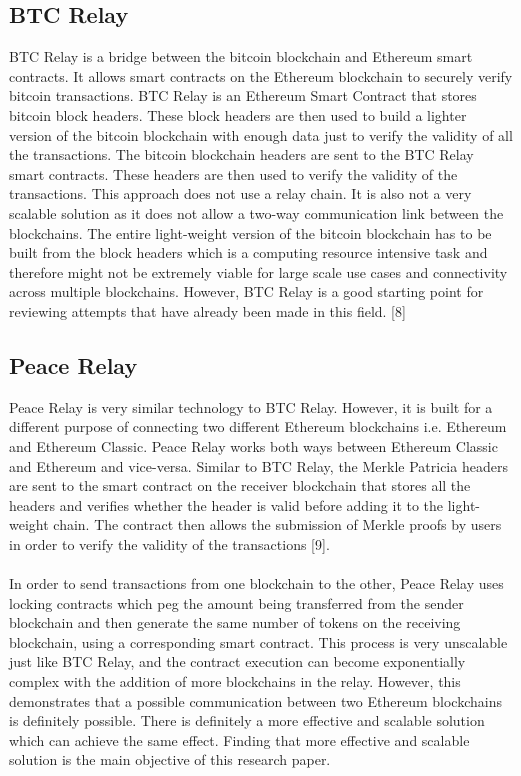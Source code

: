 \documentclass[a4paper,twoside,phd]{BYUPhys}
\begin{document}
\subsection{BTC Relay}
BTC Relay is a bridge between the bitcoin blockchain and Ethereum smart contracts. It allows smart contracts on the Ethereum blockchain to securely verify bitcoin transactions. BTC Relay is an Ethereum Smart Contract that stores bitcoin block headers. These block headers are then used to build a lighter version of the bitcoin blockchain with enough data just to verify the validity of all the transactions. The bitcoin blockchain headers are sent to the BTC Relay smart contracts. These headers are then used to verify the validity of the transactions. This approach does not use a relay chain. It is also not a very scalable solution as it does not allow a two-way communication link between the blockchains. The entire light-weight version of the bitcoin blockchain has to be built from the block headers which is a computing resource intensive task and therefore might not be extremely viable for large scale use cases and connectivity across multiple blockchains. However, BTC Relay is a good starting point for reviewing attempts that have already been made in this field. [8]
\subsection{Peace Relay}
Peace Relay is very similar technology to BTC Relay. However, it is built for a different purpose of connecting two different Ethereum blockchains i.e. Ethereum and Ethereum Classic. Peace Relay works both ways between Ethereum Classic and Ethereum and vice-versa. Similar to BTC Relay, the Merkle Patricia headers are sent to the smart contract on the receiver blockchain that stores all the headers and verifies whether the header is valid before adding it to the light-weight chain. The contract then allows the submission of Merkle proofs by users in order to verify the validity of the transactions [9].
\\
\\
In order to send transactions from one blockchain to the other, Peace Relay uses locking contracts which peg the amount being transferred from the sender blockchain and then generate the same number of tokens on the receiving blockchain, using a corresponding smart contract. This process is very unscalable just like BTC Relay, and the contract execution can become exponentially complex with the addition of more blockchains in the relay. However, this demonstrates that a possible communication between two Ethereum blockchains is definitely possible. There is definitely a more effective and scalable solution which can achieve the same effect. Finding that more effective and scalable solution is the main objective of this research paper.
\end{document}

